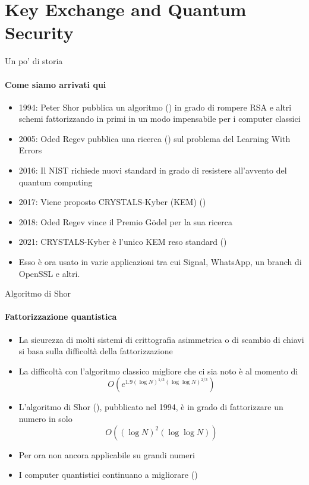 \section{Key Exchange and Quantum Security}

\begin{frame}{Un po' di storia}

\framesubtitle{Come siamo arrivati qui}

\begin{itemize}%
    \item 1994: Peter Shor pubblica un algoritmo (\cite{shor,shor2}) in grado di rompere RSA e altri schemi fattorizzando in primi in un modo impensabile per i computer classici
    \item 2005: Oded Regev pubblica una ricerca (\cite{regev}) sul problema del Learning With Errors
    \item 2016: Il NIST richiede nuovi standard in grado di resistere all'avvento del quantum computing
    \item 2017: Viene proposto CRYSTALS-Kyber (KEM) (\cite{ufficiale})
    \item 2018: Oded Regev vince il Premio Gödel per la sua ricerca
    \item 2021: CRYSTALS-Kyber è l'unico KEM reso standard (\cite{nistwinners})
    \item Esso è ora usato in varie applicazioni tra cui Signal, WhatsApp, un branch di OpenSSL e altri.
\end{itemize}

\end{frame}

\begin{frame}{Algoritmo di Shor}
\framesubtitle{Fattorizzazione quantistica}

\begin{itemize}%
    \item La sicurezza di molti sistemi di crittografia asimmetrica o di scambio di chiavi si basa sulla difficoltà della fattorizzazione
    \item La difficoltà con l'algoritmo classico migliore che ci sia noto è al momento di \[
            O\left(e^{1.9(\log N)^{1/3}(\log\log N)^{2/3}}\right)
\]
    \item L'algoritmo di Shor (\cite{shor,shor2}), pubblicato nel 1994, è in grado di fattorizzare un numero in solo \[
    O\left((\log N)^2(\log\log N)\right)
\]
    \item Per ora non ancora applicabile su grandi numeri
    \item I computer quantistici continuano a migliorare (\cite{shorreal})
\end{itemize}
\end{frame}

